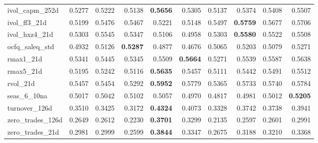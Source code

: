 \begin{longtable}{>{\raggedright\arraybackslash}p{2.6cm}rrrrrrrrr}
ivol\_capm\_252d & 0.5277 & 0.5222 & 0.5138 & \textbf{\cellcolor{blue!10}0.5656} & \cellcolor{blue!10}0.5305 & 0.5137 & \cellcolor{blue!10}0.5374 & \cellcolor{blue!10}0.5408 & \cellcolor{blue!10}0.5507 \\
ivol\_ff3\_21d & 0.5199 & \cellcolor{blue!10}0.5476 & \cellcolor{blue!10}0.5467 & \cellcolor{blue!10}0.5221 & 0.5148 & \cellcolor{blue!10}0.5497 & \textbf{\cellcolor{blue!10}0.5759} & \cellcolor{blue!10}0.5677 & \cellcolor{blue!10}0.5706 \\
ivol\_hxz4\_21d & 0.5303 & \cellcolor{blue!10}0.5545 & \cellcolor{blue!10}0.5347 & 0.5106 & 0.4958 & 0.5303 & \textbf{\cellcolor{blue!10}0.5580} & \cellcolor{blue!10}0.5522 & \cellcolor{blue!10}0.5508 \\
ocfq\_saleq\_std & 0.4932 & \cellcolor{blue!10}0.5126 & \textbf{\cellcolor{blue!10}0.5287} & 0.4877 & 0.4676 & \cellcolor{blue!10}0.5065 & \cellcolor{blue!10}0.5203 & \cellcolor{blue!10}0.5079 & \cellcolor{blue!10}0.5271 \\
rmax1\_21d & 0.5341 & \cellcolor{blue!10}0.5445 & \cellcolor{blue!10}0.5345 & \cellcolor{blue!10}0.5509 & \textbf{\cellcolor{blue!10}0.5664} & 0.5271 & \cellcolor{blue!10}0.5539 & \cellcolor{blue!10}0.5587 & \cellcolor{blue!10}0.5638 \\
rmax5\_21d & 0.5195 & \cellcolor{blue!10}0.5242 & 0.5116 & \textbf{\cellcolor{blue!10}0.5635} & \cellcolor{blue!10}0.5457 & 0.5111 & \cellcolor{blue!10}0.5442 & \cellcolor{blue!10}0.5491 & \cellcolor{blue!10}0.5512 \\
rvol\_21d & 0.5457 & 0.5454 & 0.5292 & \textbf{\cellcolor{blue!10}0.5952} & \cellcolor{blue!10}0.5779 & 0.5365 & \cellcolor{blue!10}0.5733 & \cellcolor{blue!10}0.5740 & \cellcolor{blue!10}0.5784 \\
seas\_6\_10na & 0.5017 & \cellcolor{blue!10}0.5042 & \cellcolor{blue!10}0.5102 & \cellcolor{blue!10}0.5057 & 0.4970 & 0.4817 & 0.4981 & 0.5012 & \textbf{\cellcolor{blue!10}0.5205} \\
turnover\_126d & 0.3510 & 0.3425 & 0.3172 & \textbf{\cellcolor{blue!10}0.4324} & \cellcolor{blue!10}0.4073 & 0.3328 & \cellcolor{blue!10}0.3742 & \cellcolor{blue!10}0.3738 & \cellcolor{blue!10}0.3941 \\
zero\_trades\_126d & 0.2649 & 0.2612 & 0.2230 & \textbf{\cellcolor{blue!10}0.3701} & \cellcolor{blue!10}0.3299 & 0.2135 & 0.2597 & 0.2601 & \cellcolor{blue!10}0.2991 \\
zero\_trades\_21d & 0.2981 & \cellcolor{blue!10}0.2999 & 0.2599 & \textbf{\cellcolor{blue!10}0.3844} & \cellcolor{blue!10}0.3347 & 0.2675 & \cellcolor{blue!10}0.3188 & \cellcolor{blue!10}0.3210 & \cellcolor{blue!10}0.3368 \\

\end{longtable}
